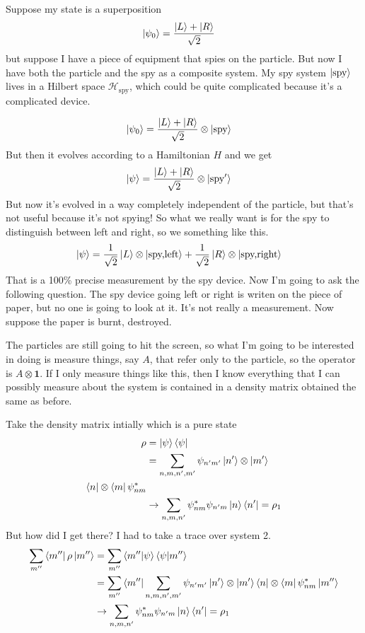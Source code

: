 Suppose my state is a superposition
\begin{align}
    \ket{\psi_0} &=
    \frac{\ket{L} + \ket{R}}{\sqrt{2}}
\end{align}
but suppose I have a piece of equipment that spies on the particle.
But now I have both the particle and the spy
as a composite system.
My spy system $\ket{\text{spy}}$ lives in a Hilbert space
$\mathcal{H}_{\text{spy}}$,
which could be quite complicated
because it's a complicated device.

\begin{align}
    \ket{\psi_0} &=
    \frac{\ket{L} + \ket{R}}{\sqrt{2}}
    \otimes
    \ket{\text{spy}}
\end{align}
But then it evolves according to a Hamiltonian $H$ and we get
\begin{align}
    \ket{\psi} &=
    \frac{\ket{L} + \ket{R}}{\sqrt{2}}
    \otimes
    \ket{\text{spy}'}
\end{align}
But now it's evolved in a way completely independent of the particle,
but that's not useful because it's not spying!
So what we really want is for the spy to distinguish between left and right,
so we something like this.
\begin{align}
    \ket{\psi} &=
    \frac{1}{\sqrt{2}}
    \ket{L}
    \otimes
    \ket{\text{spy,left}}
    +
    \frac{1}{\sqrt{2}}
    \ket{R}
    \otimes
    \ket{\text{spy,right}}
\end{align}
That is a 100\% precise measurement by the spy device.
Now I'm going to ask the following question.
The spy device going left or right is writen on the piece of paper,
but no one is going to look at it.
It's not really a measurement.
Now suppose the paper is burnt,
destroyed.

The particles are still going to hit the screen,
so what I'm going to be interested in doing is measure things,
say $A$,
that refer only to the particle,
so the operator is $A\otimes\mathbf{1}$.
If I only measure things like this,
then I know everything that I can possibly measure about the system
is contained in a density matrix obtained the same as before.

Take the density matrix intially which is a pure state
\begin{align}
    \rho &= \ket{\psi}\bra{\psi}\\
    &=
    \sum_{n,m,n',m'} \psi_{n'm'}\ket{n'}\otimes\ket{m'}\\
    \bra{n}\otimes\bra{m}\psi_{nm}^*\\
    &\to
    \sum_{n,m,n'} \psi_{nm}^* \psi_{n'm}\ket{n}\bra{n'}
    = \rho_1
\end{align}
But how did I get there?
I had to take a trace over system 2.
\begin{align}
    \sum_{m''}\bra{m''}\rho\ket{m''} &=
    \sum_{m''}\bra{m''}\ket{\psi}\bra{\psi}\ket{m''}\\
    &=
    \sum_{m''}\bra{m''}\sum_{n,m,n',m'} \psi_{n'm'}\ket{n'}\otimes\ket{m'}
    \bra{n}\otimes\bra{m}\psi_{nm}^*\ket{m''}\\
    &\to
    \sum_{n,m,n'} \psi_{nm}^* \psi_{n'm}\ket{n}\bra{n'}
    = \rho_1
\end{align}

